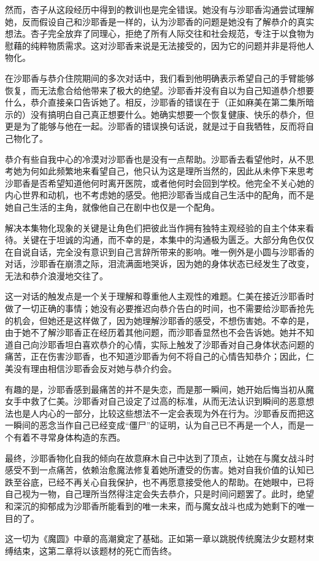 然而，杏子从这段经历中得到的教训也是完全错误。她没有与沙耶香沟通尝试理解她，反而假设自己和沙耶香是一样的，认为沙耶香的问题是她没有了解恭介的真实想法。杏子完全放弃了同理心，拒绝了所有人际交往和社会规范，专注于以食物为慰藉的纯粹物质需求。这对沙耶香来说是无法接受的，因为它的问题并非是将他人物化。

在沙耶香与恭介住院期间的多次对话中，我们看到他明确表示希望自己的手臂能够恢复，而无法愈合给他带来了极大的绝望。沙耶香并没有自以为自己知道恭介想要什么，恭介直接亲口告诉她了。相反，沙耶香的错误在于（正如麻美在第二集所暗示的）没有搞明白自己真正想要什么。她确实想要一个恢复健康、快乐的恭介，但更是为了能够与他在一起。沙耶香的错误换句话说，就是过于自我牺牲，反而将自己物化了。

恭介有些自我中心的冷漠对沙耶香也是没有一点帮助。沙耶香去看望他时，从不思考她为何如此频繁地来看望自己，他只认为这是理所当然的，因此从未停下来思考沙耶香是否希望知道他何时离开医院，或者他何时会回到学校。他完全不关心她的内心世界和动机，也不考虑她的感受。他把沙耶香当成自己生活中的配角，而不是她自己生活的主角，就像他自己在剧中也仅是一个配角。

解决本集物化现象的关键是让角色们把彼此当作拥有独特主观经验的自主个体来看待。关键在于坦诚的沟通，而不幸的是，本集中的沟通极为匮乏。大部分角色仅仅在自说自话，完全没有意识到自己言辞所带来的影响。唯一例外是小圆与沙耶香的对话，沙耶香在崩溃之际，泪流满面地哭诉，因为她的身体状态已经发生了改变，无法和恭介浪漫地交往了。

这一对话的触发点是一个关于理解和尊重他人主观性的难题。仁美在接近沙耶香时做了一切正确的事情；她没有必要推迟向恭介告白的时间，也不需要给沙耶香抢先的机会，但她还是这样做了，因为她理解沙耶香的感受，不想伤害她。不幸的是，由于她不了解沙耶香正在经历着其他问题，而沙耶香显然也不会告诉她。她并不知道自己向沙耶香坦白喜欢恭介的心情，实际上触发了沙耶香对自己身体状态问题的痛苦，正在伤害沙耶香，也不知道沙耶香为何不将自己的心情告知恭介；因此，仁美没有理由相信沙耶香会反对她与恭介约会。

有趣的是，沙耶香感到最痛苦的并不是失恋，而是那一瞬间，她开始后悔当初从魔女手中救了仁美。沙耶香对自己设定了过高的标准，从而无法认识到瞬间的恶意想法也是人内心的一部分，比较这些想法不一定会表现为外在行为。沙耶香反而把这一瞬间的恶念当作自己已经变成“僵尸”的证明，认为自己已不再是一个人，而是一个有着不寻常身体构造的东西。

最终，沙耶香物化自我的倾向在故意麻木自己中达到了顶点，让她在与魔女战斗时感受不到一点痛苦，依赖治愈魔法修复着她所遭受的伤害。她对自我价值的认知已跌至谷底，已经不再关心自我保护，也不再愿意接受他人的帮助。在她眼中，已将自己视为一物，自己理所当然得注定会失去恭介，只是时间问题罢了。此时，绝望和深沉的抑郁成为沙耶香所能看到的唯一未来，而与魔女战斗也成为她剩下的唯一目的了。

这一切为《魔圆》中章的高潮奠定了基础。正如第一章以跳脱传统魔法少女题材束缚结束，这第二章将以该题材的死亡而告终。

